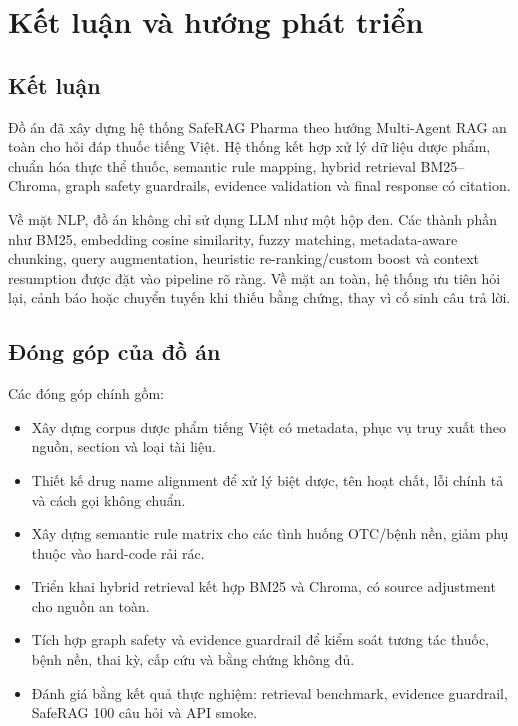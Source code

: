 \chapter{Kết luận và hướng phát triển}

\section{Kết luận}

Đồ án đã xây dựng hệ thống SafeRAG Pharma theo hướng Multi-Agent RAG an toàn cho hỏi đáp thuốc tiếng Việt. Hệ thống kết hợp xử lý dữ liệu dược phẩm, chuẩn hóa thực thể thuốc, semantic rule mapping, hybrid retrieval BM25--Chroma, graph safety guardrails, evidence validation và final response có citation.

Về mặt NLP, đồ án không chỉ sử dụng LLM như một hộp đen. Các thành phần như BM25, embedding cosine similarity, fuzzy matching, metadata-aware chunking, query augmentation, heuristic re-ranking/custom boost và context resumption được đặt vào pipeline rõ ràng. Về mặt an toàn, hệ thống ưu tiên hỏi lại, cảnh báo hoặc chuyển tuyến khi thiếu bằng chứng, thay vì cố sinh câu trả lời.

\section{Đóng góp của đồ án}

Các đóng góp chính gồm:

\begin{itemize}
  \item Xây dựng corpus dược phẩm tiếng Việt có metadata, phục vụ truy xuất theo nguồn, section và loại tài liệu.
  \item Thiết kế drug name alignment để xử lý biệt dược, tên hoạt chất, lỗi chính tả và cách gọi không chuẩn.
  \item Xây dựng semantic rule matrix cho các tình huống OTC/bệnh nền, giảm phụ thuộc vào hard-code rải rác.
  \item Triển khai hybrid retrieval kết hợp BM25 và Chroma, có source adjustment cho nguồn an toàn.
  \item Tích hợp graph safety và evidence guardrail để kiểm soát tương tác thuốc, bệnh nền, thai kỳ, cấp cứu và bằng chứng không đủ.
  \item Đánh giá bằng kết quả thực nghiệm: retrieval benchmark, evidence guardrail, SafeRAG 100 câu hỏi và API smoke.
\end{itemize}

